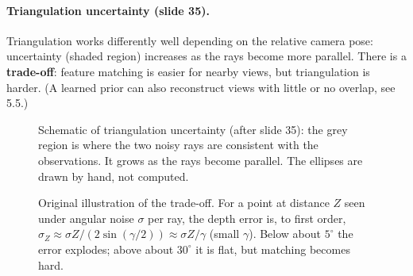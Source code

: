 \documentclass[11pt,a4paper]{article}
\newcommand{\bx}{\bm{x}}
\newcommand{\by}{\mathbf{y}}
\theoremstyle{definition}
\theoremstyle{plain}
\theoremstyle{remark}
\begin{document}
\paragraph{Triangulation uncertainty (slide 35).} Triangulation works differently well depending on the relative camera pose: uncertainty (shaded region) increases as the rays become more parallel. There is a \textbf{trade-off}: feature matching is easier for nearby views, but triangulation is harder. (A learned prior can also reconstruct views with little or no overlap, see 5.5.)

\begin{figure}[H]
\centering
{}
\caption{Schematic of triangulation uncertainty (after slide 35): the grey region is where the two noisy rays are consistent with the observations. It grows as the rays become parallel. The ellipses are drawn by hand, not computed.}
\end{figure}

\begin{figure}[H]
\centering
{}
\caption{Original illustration of the trade-off. For a point at distance $Z$ seen under angular noise $\sigma$ per ray, the depth error is, to first order, $\sigma_Z\approx\sigma Z/(2\sin(\gamma/2))\approx\sigma Z/\gamma$ (small $\gamma$). Below about $5^\circ$ the error explodes; above about $30^\circ$ it is flat, but matching becomes hard.}
\end{figure}
\end{document}
